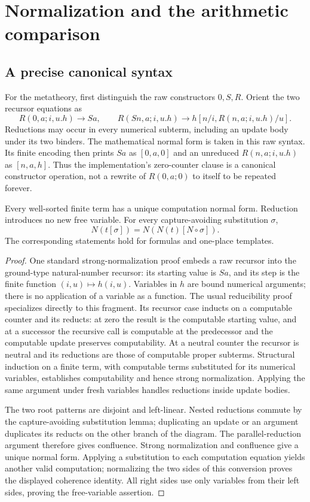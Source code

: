 \section{Normalization and the arithmetic comparison}
\label{sec:normalization}

\subsection{A precise canonical syntax}

For the metatheory, first distinguish the raw constructors $0,S,R$.
Orient the two recursor equations as
\[
 R(0,a;i,u.h)\longrightarrow Sa,\qquad
 R(Sn,a;i,u.h)\longrightarrow h[n/i,R(n,a;i,u.h)/u].
\]
Reductions may occur in every numerical subterm, including an update
body under its two binders. The mathematical normal form is taken in
this raw syntax. Its finite encoding then prints $Sa$ as $[0,a,0]$ and
an unreduced $R(n,a;i,u.h)$ as $[n,a,h]$. Thus the implementation's
zero-counter clause is a canonical constructor operation, not a rewrite
of $R(0,a;0)$ to itself to be repeated forever.

\begin{lemma}
Every well-sorted finite term has a unique computation normal form.
Reduction introduces no new free variable. For every capture-avoiding
substitution $\sigma$,
\[
 N(t[\sigma])=N(N(t)[N\circ\sigma]).
\]
The corresponding statements hold for formulas and one-place templates.
\end{lemma}
\begin{proof}
One standard strong-normalization proof embeds a raw recursor into the
ground-type natural-number recursor: its starting value is $Sa$, and its
step is the finite function $(i,u)\mapsto h(i,u)$. Variables in $h$ are
bound numerical arguments; there is no application of a variable as a
function. The usual reducibility proof specializes directly to this
fragment. Its recursor case inducts on a computable counter and its
reducts: at zero the result is the computable starting value, and at a
successor the recursive call is computable at the predecessor and the
computable update preserves computability. At a neutral counter the
recursor is neutral and its reductions are those of computable proper
subterms. Structural induction on a finite term, with computable terms
substituted for its numerical variables, establishes computability and
hence strong normalization. Applying the same argument under fresh
variables handles reductions inside update bodies.

The two root patterns are disjoint and left-linear. Nested reductions
commute by the capture-avoiding substitution lemma; duplicating an update
or an argument duplicates its reducts on the other branch of the diagram.
The parallel-reduction argument therefore gives confluence. Strong
normalization and confluence give a unique normal form. Applying a
substitution to each computation equation yields another valid
computation; normalizing the two sides of this conversion proves the
displayed coherence identity. All right sides use only variables from
their left sides, proving the free-variable assertion.
\end{proof}

